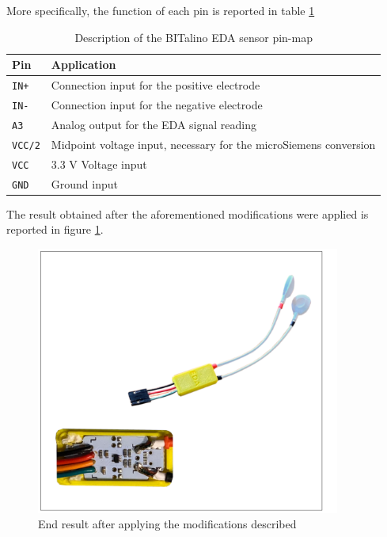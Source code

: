 More specifically, the function of each pin is reported in table \ref{toc:bitalino-pinmap-table}

\begin{table}[H]
\centering
\begin{tabular}{ll}
    \hline
    \textbf{Pin}            & \textbf{Application} \\
    \hline
    \texttt{IN+}            & Connection input for the positive electrode \\
    \texttt{IN-}            & Connection input for the negative electrode \\
    \texttt{A3}             & Analog output for the EDA signal reading \\
    \texttt{VCC/2}          & Midpoint voltage input, necessary for the microSiemens conversion \\
    \texttt{VCC}            & 3.3 V Voltage input \\
    \texttt{GND}            & Ground input \\
    \hline
\end{tabular}
\caption{Description of the BITalino EDA sensor pin-map}
\label{toc:bitalino-pinmap-table}
\end{table}

\vspace{1cm}

The result obtained after the aforementioned modifications were applied is reported in figure \ref{fig:full-sensor-configuration}. 

\begin{figure}
    \centering
    \includegraphics[width=10cm]{./images/full-sensor-view.drawio.png}
    \caption{End result after applying the modifications described}
    \label{fig:full-sensor-configuration}
\end{figure}

